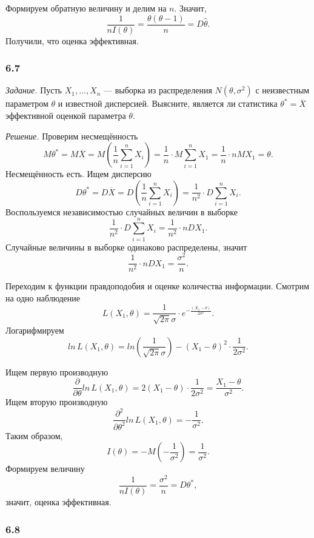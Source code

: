 Формируем обратную величину и делим на $n$.
Значит,
$$ \frac{1}{nI \left( \theta \right) } =
  \frac{ \theta \left( \theta - 1 \right) }{n} =
  D \hat{ \theta }.$$
Получили, что оценка эффективная.

\subsubsection*{6.7}

\textit{Задание.}
Пусть $X_1, \dotsc, X_n$ ---
выборка из распределения $N \left( \theta, \sigma^2 \right) $ с неизвестным параметром $ \theta $
и известной дисперсией.
Выясните,
является ли статистика $ \theta^* = \overline{X}$ эффективной оценкой параметра $ \theta $.

\textit{Решение.} Проверим несмещённость
$$M \theta^* =
  M \overline{X} =
  M \left( \frac{1}{n} \sum \limits_{i = 1}^n X_i \right) =
  \frac{1}{n} \cdot M \sum \limits_{i = 1}^n X_1 =
  \frac{1}{n} \cdot nMX_1 =
  \theta.$$
Несмещённость есть.
Ищем дисперсию
$$D \theta^* =
  D \overline{X} =
  D \left( \frac{1}{n} \sum \limits_{i = 1}^n X_i \right) =
  \frac{1}{n^2} \cdot D \sum \limits_{i = 1}^n X_i.$$
Воспользуемся независимостью случайных величин в выборке
$$ \frac{1}{n^2} \cdot D \sum \limits_{i = 1}^n X_i =
  \frac{1}{n^2} \cdot nDX_1.$$
Случайные величины в выборке одинаково распределены, значит
$$ \frac{1}{n^2} \cdot nDX_1 =
  \frac{ \sigma^2}{n}.$$

Переходим к функции правдоподобия и оценке количества информации.
Смотрим на одно наблюдение
$$L \left( X_1, \theta \right) =
  \frac{1}{ \sqrt{2 \pi } \sigma } \cdot e^{- \frac{ \left( X_1 - \theta \right) }{2 \sigma^2}}.$$
Логарифмируем
$$ln \, L \left( X_1, \theta \right) =
  ln \left( \frac{1}{ \sqrt{2 \pi } \sigma } \right) -
  \left( X_1 - \theta \right)^2 \cdot \frac{1}{2 \sigma^2}.$$

Ищем первую производную
$$ \frac{ \partial }{ \partial \theta } ln \, L \left( X_1, \theta \right) =
  2 \left( X_1 - \theta \right) \cdot \frac{1}{2 \sigma^2} =
  \frac{X_1 - \theta }{ \sigma^2}.$$
Ищем вторую производную
$$ \frac{ \partial^2 }{ \partial \theta^2} ln \, L \left( X_1, \theta \right) =
  - \frac{1}{ \sigma^2}.$$
Таким образом,
$$I \left( \theta \right) =
  -M \left( - \frac{1}{ \sigma^2} \right) =
  \frac{1}{ \sigma^2}.$$
Формируем величину
$$ \frac{1}{nI \left( \theta \right) } =
  \frac{ \sigma^2}{n} =
  D \theta^*,$$
значит, оценка эффективная.

\subsubsection*{6.8}

